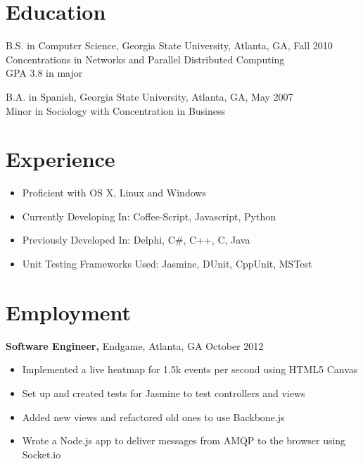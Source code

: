 \documentclass[margin]{res}
\begin{document}
 
 
 
\address{{\bf Present Address} \\ 204 Drexel Ave Apt B \\ Decatur, GA 30030  \\
        (678) 773-1545 }
 
\begin{resume} 
 
\section{Education} 
    B.S. in Computer Science, Georgia State University, Atlanta, GA, Fall 2010  \\
    Concentrations in Networks and Parallel Distributed Computing \\
    GPA 3.8 in major

    B.A. in Spanish, Georgia State University, Atlanta, GA, May 2007 \\
    Minor in Sociology with Concentration in Business
 

\section{Experience}
    \begin{itemize} \itemsep -2pt  %
        \item Proficient with OS X, Linux and Windows
        \item Currently Developing In: Coffee-Script, Javascript, Python
        \item Previously Developed In: Delphi, C\#, C++, C, Java
        \item Unit Testing Frameworks Used: Jasmine, DUnit, CppUnit, MSTest
    \end{itemize}

\section{Employment} 

    {\bf Software Engineer,} Endgame, Atlanta, GA \hfill October 2012 
        \begin{itemize} \itemsep -2pt %
            \item Implemented a live  heatmap for 1.5k events per second using HTML5 Canvas
            \item Set up and created tests for Jasmine to test controllers and views
            \item Added new views and refactored old ones to use Backbone.js
            \item Wrote a Node.js app to deliver messages from AMQP to the browser using
                Socket.io
        \end{itemize}


\end{resume}
\end{document}
